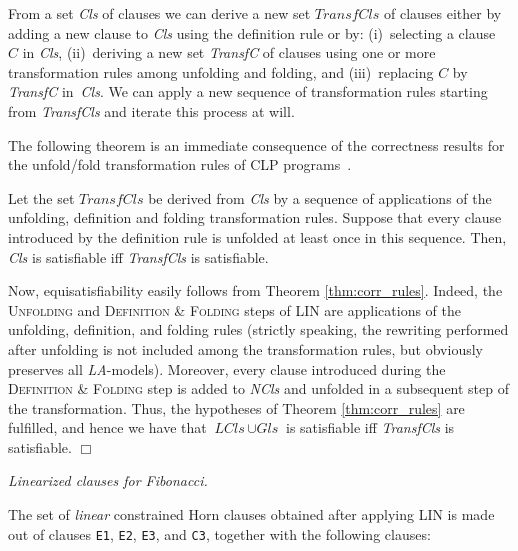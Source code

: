 \documentclass[english]{tlp}
\newcommand{\tts}{\tt \small}
\begin{document}
\smallskip

From a set {\it Cls} of clauses
we can derive a new set $\textit{TransfCls}$ of clauses either by
adding a new clause to {\it Cls} using the definition rule or by: 
(i)~selecting a clause~$C$ in {\it Cls},
(ii)~deriving a new set \textit{TransfC} of clauses using
one or more transformation rules among unfolding and folding, and
(iii)~replacing $C$ by \textit{TransfC} in~{\it Cls}.
We can apply a new sequence of transformation rules
starting from \textit{TransfCls} and iterate this process at will.

The following theorem is an immediate consequence of the correctness results 
for the unfold/fold transformation rules of CLP programs~\cite{EtG96}. 

\begin{theorem}
\label{thm:corr_rules}
Let the set $\textit{TransfCls}$ be derived from {\it Cls} by a sequence
of applications of the unfolding, definition and folding transformation rules. 
Suppose that every clause introduced by the definition
rule is unfolded at least once in this sequence.
Then, {\it Cls} is satisfiable \mbox{iff}
{\it TransfCls} is satisfiable.
\end{theorem}

Now, equisatisfiability easily follows from 
Theorem \ref{thm:corr_rules}. Indeed, the \textsc{Unfolding} and
\textsc{Definition \& Folding} steps of LIN
are applications of the unfolding, definition, and folding rules
(strictly speaking, the rewriting performed after unfolding is not included 
among the transformation rules, but obviously preserves all {\it LA}-models). 
Moreover, every clause introduced during the \textsc{Definition \& Folding} step
is added to {\it NCls} and unfolded in a subsequent step of the transformation.
Thus, the hypotheses of Theorem \ref{thm:corr_rules} are fulfilled, and hence
we have that $\textit{LCls}\, \cup \textit{Gls}$ is satisfiable iff
\textit{TransfCls} is satisfiable. \hfill $\Box$


\bigskip

\noindent
{\it Linearized clauses for Fibonacci.} 

\noindent
The set of {\it linear} constrained Horn clauses obtained after applying LIN
is made out of clauses {\tts E1}, {\tts E2}, 
{\tts E3}, and {\tts C3}, together with the following clauses:
\vspace{1.5mm}
\end{document}
